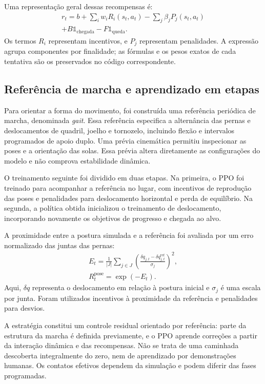 Uma representação geral dessas recompensas é:
\begin{multline}
r_t=b+\sum_i w_iR_i(s_t,a_t)-\sum_j\beta_jP_j(s_t,a_t)\\
+B\mathbb{1}_{\mathrm{chegada}}-F\mathbb{1}_{\mathrm{queda}}.
\end{multline}
Os termos $R_i$ representam incentivos, e $P_j$ representam penalidades. A expressão agrupa componentes por finalidade; as fórmulas e os pesos exatos de cada tentativa são os preservados no código correspondente.

\subsection{Referência de marcha e aprendizado em etapas}

Para orientar a forma do movimento, foi construída uma referência periódica de marcha, denominada \textit{gait}. Essa referência especifica a alternância das pernas e deslocamentos de quadril, joelho e tornozelo, incluindo flexão e intervalos programados de apoio duplo. Uma prévia cinemática permitiu inspecionar as poses e a orientação das solas. Essa prévia altera diretamente as configurações do modelo e não comprova estabilidade dinâmica.

O treinamento seguinte foi dividido em duas etapas. Na primeira, o PPO foi treinado para acompanhar a referência no lugar, com incentivos de reprodução das poses e penalidades para deslocamento horizontal e perda de equilíbrio. Na segunda, a política obtida inicializou o treinamento de deslocamento, incorporando novamente os objetivos de progresso e chegada ao alvo.

A proximidade entre a postura simulada e a referência foi avaliada por um erro normalizado das juntas das pernas:
\begin{gather}
E_t=\frac{1}{|J|}\sum_{j\in J}
\left(\frac{\delta q_{j,t}-\delta q^{\mathrm{ref}}_{j,t}}{\sigma_j}\right)^2,\\
R^{\mathrm{pose}}_t=\exp(-E_t).
\end{gather}
Aqui, $\delta q$ representa o deslocamento em relação à postura inicial e $\sigma_j$ é uma escala por junta. Foram utilizados incentivos à proximidade da referência e penalidades para desvios.

A estratégia constitui um controle residual orientado por referência: parte da estrutura da marcha é definida previamente, e o PPO aprende correções a partir da interação dinâmica e das recompensas. Não se trata de uma caminhada descoberta integralmente do zero, nem de aprendizado por demonstrações humanas. Os contatos efetivos dependem da simulação e podem diferir das fases programadas.

